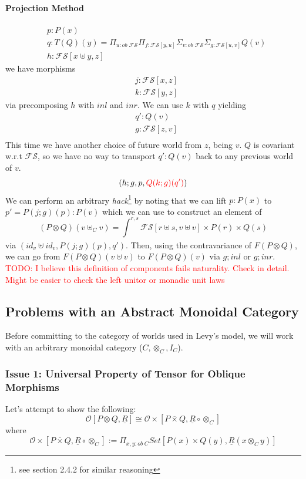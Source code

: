 \documentclass{article}
\newcommand{\red}[1]{\textcolor{red}{#1}}
\begin{document}
\paragraph{Projection Method}
\begin{align*}
    &p : P(x)\\
    &q : T(Q)(y) = \Pi_{u : ob \; \mathcal{FS}}\Pi_{f : \mathcal{FS}[ y , u]}\Sigma_{v : ob \;\mathcal{FS}}\Sigma_{g : \mathcal{FS}[ u , v ]}Q(v)\\
    &h : \mathcal{FS}[x\uplus y , z]
\end{align*}
we have morphisms
\begin{align*}
    & j : \mathcal{FS}[x , z]\\
    & k : \mathcal{FS}[y , z]
\end{align*}
via precomposing $h$ with $inl$ and $inr$. We can use $k$ with $q$ yielding
\begin{align*}
    &q' : Q(v)\\
    &g : \mathcal{FS}[ z , v ]\\
\end{align*}
This time we have another choice of future world from $z$, being $v$. 
$Q$ is covariant w.r.t $\mathcal{FS}$, so we have no way to transport $q' : Q(v)$ back to any
previous world of $v$.
\[
  (h ; g , p, \red{Q(k ; g)(q')})  
\]
We can perform an arbitrary \textit{hack}\footnote{see section 2.4.2 for similar reasoning}
by noting that we can lift $p: P(x)$ to $p' = P(j ; g)(p) : P(v)$ which we can use to construct an element of 
\[
    (P \otimes Q)(v \uplus_C v) = \int_{}^{r,s} \mathcal{FS}[r \uplus s, v \uplus v] 
    \times P(r) \times Q(s)
\]
via $(id_v \uplus id_v, P(j ; g)(p), q')$. 
Then, using the contravariance of $F(P \otimes Q)$, 
we can go from $F(P \otimes Q)(v \uplus v)$ to $F(P \otimes Q)(v)$ via $g ; inl$ or $g ; inr$.
\red{TODO: I believe this definition of components fails naturality. Check in detail. 
Might be easier to check the left unitor or monadic unit laws}



\subsection{Problems with an Abstract Monoidal Category}
Before committing to the category 
of worlds used in Levy's model, we will work with an arbitrary monoidal category ($C, \otimes_C , I_C$). 
\subsubsection{Issue 1: Universal Property of Tensor for Oblique Morphisms}
Let's attempt to show the following:
\[
  \mathcal{O}[P \otimes Q , \underline{R}] \cong \mathcal{O\times}[P \overline{\times} Q , \underline{R} \circ \otimes_C]  
\]
where 
\[
    \mathcal{O\times}[P \overline{\times} Q , \underline{R} \circ \otimes_C] 
    := \Pi_{x , y : ob \;C}Set[P(x)\times Q(y) , \underline{R}(x \otimes_C y)]
\]
\end{document}
